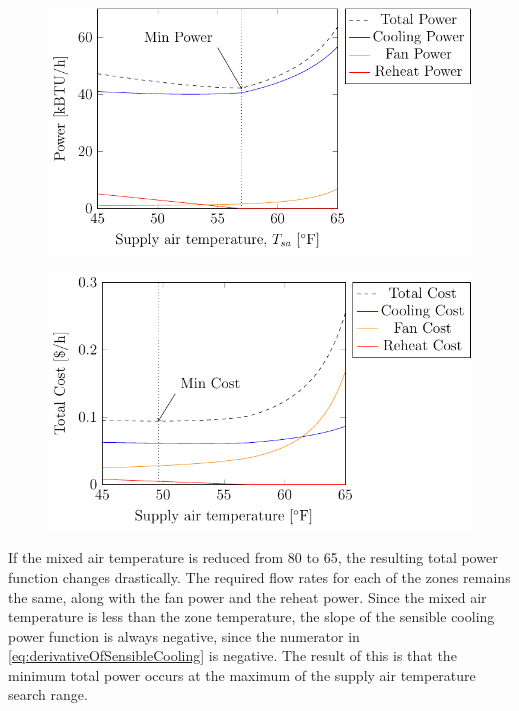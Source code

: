 \begin{figure}
\centering
\includegraphics{Plots/32-SimplifiedExample/simplifiedExample.pdf}
\caption{}
\label{fig:simplifiedExamplePower}
\end{figure}

\begin{figure}
\centering
\includegraphics{Plots/35-SimplifiedExampleCostHighMAT/simplifiedExampleCostHighMAT.pdf}
\caption{}
\label{fig:simplifiedExampleCost}
\end{figure}


If the mixed air temperature is reduced from \SI{80}{\degreeF} to
\SI{65}{\degreeF}, the resulting total power function changes
drastically. The required flow rates for each of the zones remains the
same, along with the fan power and the reheat power. Since the mixed air
temperature is less than the zone temperature, the slope of the sensible
cooling power function is always negative, since the numerator in
 \ref{eq:derivativeOfSensibleCooling} is negative. The
result of this is that the minimum total power occurs at the maximum of
the supply air temperature search range.   

